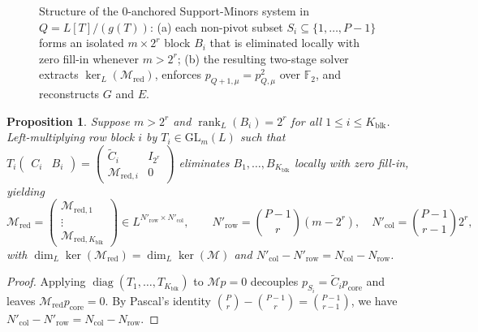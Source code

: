 \documentclass[11pt,a4paper]{article}
\newtheorem{proposition}[theorem]{Proposition}
\theoremstyle{definition}
\theoremstyle{remark}
\newcommand{\Ftwo}{\mathbb{F}_2}
\newcommand{\GL}{\mathrm{GL}}
\newcommand{\rk}{\operatorname{rank}}
\newcommand{\RREF}{\operatorname{RREF}}
\newcommand{\diag}{\operatorname{diag}}
\begin{document}
\begin{figure}[t]
\caption{Structure of the $0$-anchored Support-Minors system in $Q = L[T]/(g(T))$: (a) each non-pivot subset $S_i \subseteq \{1,\dots,P-1\}$ forms an isolated $m \times 2^r$ block $B_i$ that is eliminated locally with zero fill-in whenever $m > 2^r$; (b) the resulting two-stage solver extracts $\ker_L(\mathcal{M}_{\text{red}})$, enforces $p_{Q+1,\mu} = p_{Q,\mu}^2$ over $\Ftwo$, and reconstructs $G$ and $E$.}
\label{fig:schur-pipeline}
\end{figure}

\begin{proposition}
\label{prop:schur}
Suppose $m > 2^r$ and $\rk_L(B_i) = 2^r$ for all $1 \le i \le K_{\text{blk}}$. Left-multiplying row block $i$ by $T_i \in \GL_m(L)$ such that $T_i \begin{pmatrix} C_i & B_i \end{pmatrix} = \begin{pmatrix} \widetilde{C}_i & I_{2^r} \\ \mathcal{M}_{\text{red},i} & 0 \end{pmatrix}$ eliminates $B_1, \dots, B_{K_{\text{blk}}}$ locally with zero fill-in, yielding
\[
    \mathcal{M}_{\text{red}} = \begin{pmatrix} \mathcal{M}_{\text{red},1} \\ \vdots \\ \mathcal{M}_{\text{red},K_{\text{blk}}} \end{pmatrix} \in L^{N'_{\text{row}} \times N'_{\text{col}}}, \qquad
    N'_{\text{row}} = \binom{P-1}{r}(m - 2^r), \quad
    N'_{\text{col}} = \binom{P-1}{r-1} 2^r,
\]
with $\dim_L \ker(\mathcal{M}_{\text{red}}) = \dim_L \ker(\mathcal{M})$ and $N'_{\text{col}} - N'_{\text{row}} = N_{\text{col}} - N_{\text{row}}$.
\end{proposition}

\begin{proof}
Applying $\diag(T_1, \dots, T_{K_{\text{blk}}})$ to $\mathcal{M} p = 0$ decouples $p_{S_i} = \widetilde{C}_i p_{\text{core}}$ and leaves $\mathcal{M}_{\text{red}} p_{\text{core}} = 0$. By Pascal's identity $\binom{P}{r} - \binom{P-1}{r} = \binom{P-1}{r-1}$, we have $N'_{\text{col}} - N'_{\text{row}} = N_{\text{col}} - N_{\text{row}}$.
\end{proof}
\end{document}
